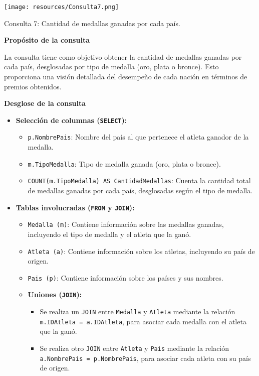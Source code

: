 \begin{center}
    \texttt{[image: resources/Consulta7.png]} 
    
   Consulta 7: Cantidad de medallas ganadas por cada país.
\end{center}

\textbf{Propósito de la consulta}

La consulta tiene como objetivo obtener la cantidad de medallas ganadas por cada país, desglosadas por tipo de medalla (oro, plata o bronce). Esto proporciona una visión detallada del desempeño de cada nación en términos de premios obtenidos.

\textbf{Desglose de la consulta}

\begin{itemize}
   \item \textbf{Selección de columnas (\texttt{SELECT}):}
   \begin{itemize}
       \item \texttt{p.NombrePais}: Nombre del país al que pertenece el atleta ganador de la medalla.
       \item \texttt{m.TipoMedalla}: Tipo de medalla ganada (oro, plata o bronce).
       \item \texttt{COUNT(m.TipoMedalla) AS CantidadMedallas}: Cuenta la cantidad total de medallas ganadas por cada país, desglosadas según el tipo de medalla.
   \end{itemize}

   \item \textbf{Tablas involucradas (\texttt{FROM} y \texttt{JOIN}):}
   \begin{itemize}
       \item \texttt{Medalla (m)}: Contiene información sobre las medallas ganadas, incluyendo el tipo de medalla y el atleta que la ganó.
       \item \texttt{Atleta (a)}: Contiene información sobre los atletas, incluyendo su país de origen.
       \item \texttt{Pais (p)}: Contiene información sobre los países y sus nombres.
       \item \textbf{Uniones (\texttt{JOIN}):}
       \begin{itemize}
           \item Se realiza un \texttt{JOIN} entre \texttt{Medalla} y \texttt{Atleta} mediante la relación \texttt{m.IDAtleta = a.IDAtleta}, para asociar cada medalla con el atleta que la ganó.
           \item Se realiza otro \texttt{JOIN} entre \texttt{Atleta} y \texttt{Pais} mediante la relación \texttt{a.NombrePais = p.NombrePais}, para asociar cada atleta con su país de origen.
       \end{itemize}
   \end{itemize}


\end{itemize}
